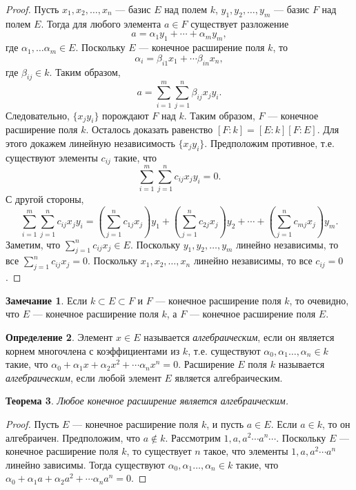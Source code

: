 \documentclass[12pt, titlepage, oneside]{amsbook}
\newtheorem{theorem}{Теорема}[chapter]
\theoremstyle{definition}
\newtheorem{definition}[theorem]{Определение}
\newtheorem{remark}[theorem]{Замечание}
\theoremstyle{remark}
\begin{document}
\begin{proof}
	Пусть $x_1,x_2,\ldots, x_n$ --- базис $E$ над полем $k$, $y_1,y_2,\ldots, y_m$ --- базис $F$ над полем $E$. Тогда для любого элемента $a\in F$ существует разложение $$a=\alpha_1 y_1+\cdots+\alpha_m y_m,$$ где $\alpha_1,\ldots\alpha_m\in E$. Поскольку $E$ --- конечное расширение поля $k$, то $$\alpha_i=\beta_{i1}x_1+\cdots\beta_{in}x_n,$$ где $\beta_{ij}\in k$. Таким образом, $$a=\sum\limits_{i=1}^m\sum\limits_{j=1}^n\beta_{ij}x_jy_i.$$ Следовательно, $\{x_jy_i\}$ порождают $F$ над $k$. Таким образом, $F$ --- конечное расширение поля $k$. Осталось доказать равенство $[F:k]=[E:k][F:E]$. Для этого докажем линейную независимость $\{x_jy_i\}$. Предположим противное, т.е. существуют элементы $c_{ij}$ такие, что $$\sum\limits_{i=1}^m\sum\limits_{j=1}^n c_{ij}x_jy_i=0.$$ С другой стороны, $$\sum\limits_{i=1}^m\sum\limits_{j=1}^n c_{ij}x_jy_i=\left(\sum\limits_{j=1}^n c_{1j} x_j\right)y_1+\left(\sum\limits_{j=1}^n c_{2j} x_j\right)y_2+\cdots+\left(\sum\limits_{j=1}^n c_{mj} x_j\right)y_m.$$ Заметим, что $\sum\limits_{j=1}^n c_{ij} x_j\in E$. Поскольку $y_1,y_2,\ldots, y_m$ линейно независимы, то все $\sum\limits_{j=1}^n c_{ij} x_j=0$. Поскольку $x_1,x_2,\ldots, x_n$ линейно независимы, то все $c_{ij}=0$.
\end{proof}

\begin{remark}
	Если $k\subset E\subset F$ и $F$ --- конечное расширение поля $k$, то очевидно, что $E$ --- конечное расширение поля $k$, а $F$ --- конечное расширение поля $E$.
\end{remark}

\begin{definition}
	Элемент $x\in E$ называется \emph{алгебраическим}, если он является корнем многочлена с коэффициентами из $k$, т.е. существуют  $\alpha_0,\alpha_1\ldots,\alpha_n\in k$ такие, что $\alpha_0+\alpha_1 x+\alpha_2 x^2+\cdots\alpha_n x^n=0.$
	Расширение $E$  поля $k$ называется \emph{алгебраическим}, если любой элемент $E$ является алгебраическим.
\end{definition}

\begin{theorem}
	\label{Ras2} Любое конечное расширение является алгебраическим.
\end{theorem}

\begin{proof}
	Пусть $E$ --- конечное расширение поля $k$, и пусть $a\in E$. Если $a\in k$, то он алгебраичен. Предположим, что $a\not\in k$. Рассмотрим $1,a,a^2\cdots a^n\cdots$. Поскольку $E$ --- конечное расширение поля $k$, то существует $n$ такое, что элементы $1,a,a^2\cdots a^n$ линейно зависимы. Тогда существуют  $\alpha_0,\alpha_1\ldots,\alpha_n\in k$ такие, что $\alpha_0+\alpha_1 a+\alpha_2 a^2+\cdots\alpha_n a^n=0.$
\end{proof}
\end{document}
